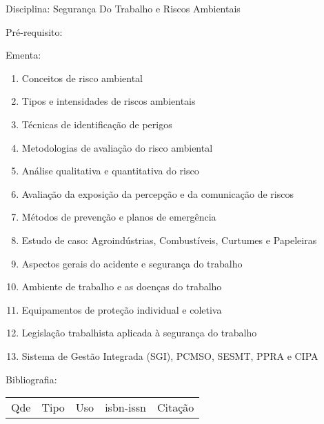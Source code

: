 \documentclass[12pt,a4paper,twoside]{report}
\begin{document}
Disciplina: Segurança Do Trabalho e Riscos Ambientais

Pré-requisito:
\begin{enumerate}
\end{enumerate}

Ementa:
\begin{enumerate}
\item Conceitos de risco ambiental
\item Tipos e intensidades de riscos ambientais
\item Técnicas de identificação de perigos
\item Metodologias de avaliação do risco ambiental
\item Análise qualitativa e quantitativa do risco
\item Avaliação da exposição da percepção e da comunicação de riscos
\item Métodos de prevenção e planos de emergência
\item Estudo de caso: Agroindústrias, Combustíveis, Curtumes e Papeleiras
\item Aspectos gerais do acidente e segurança do trabalho
\item Ambiente de trabalho e as doenças do trabalho
\item Equipamentos de proteção individual e coletiva
\item Legislação trabalhista aplicada à segurança do trabalho
\item Sistema de Gestão Integrada (SGI), PCMSO, SESMT, PPRA e CIPA
\end{enumerate}

Bibliografia:
\begin{tabular}{lllll}
Qde & Tipo & Uso & isbn-issn & Citação \\
\end{tabular}
\end{document}
